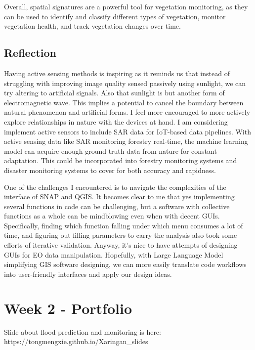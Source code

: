\documentclass[
  letterpaper,
  DIV=11,
  numbers=noendperiod]{scrreprt}
\begin{document}
Overall, spatial signatures are a powerful tool for vegetation
monitoring, as they can be used to identify and classify different types
of vegetation, monitor vegetation health, and track vegetation changes
over time.

\hypertarget{reflection}{%
\section{Reflection}\label{reflection}}

Having active sensing methods is inspiring as it reminds us that instead
of struggling with improving image quality sensed passively using
sunlight, we can try altering to artificial signals. Also that sunlight
is but another form of electromagnetic wave. This implies a potential to
cancel the boundary between natural phenomenon and artificial forms. I
feel more encouraged to more actively explore relationships in nature
with the devices at hand. I am considering implement active sensors to
include SAR data for IoT-based data pipelines. With active sensing data
like SAR monitoring forestry real-time, the machine learning model can
acquire enough ground truth data from nature for constant adaptation.
This could be incorporated into forestry monitoring systems and disaster
monitoring systems to cover for both accuracy and rapidness.

One of the challenges I encountered is to navigate the complexities of
the interface of SNAP and QGIS. It becomes clear to me that yes
implementing several functions in code can be challenging, but a
software with collective functions as a whole can be mindblowing even
when with decent GUIs. Specifically, finding which function falling
under which menu consumes a lot of time, and figuring out filling
parameters to carry the analysis also took some efforts of iterative
validation. Anyway, it's nice to have attempts of designing GUIs for EO
data manipulation. Hopefully, with Large Language Model simplifying GIS
software designing, we can more easily translate code workflows into
user-friendly interfaces and apply our design ideas.


\hypertarget{week-2---portfolio}{%
\chapter{Week 2 - Portfolio}\label{week-2---portfolio}}

Slide about flood prediction and monitoring is here:
https://tongmengxie.github.io/Xaringan\_slides
\end{document}

